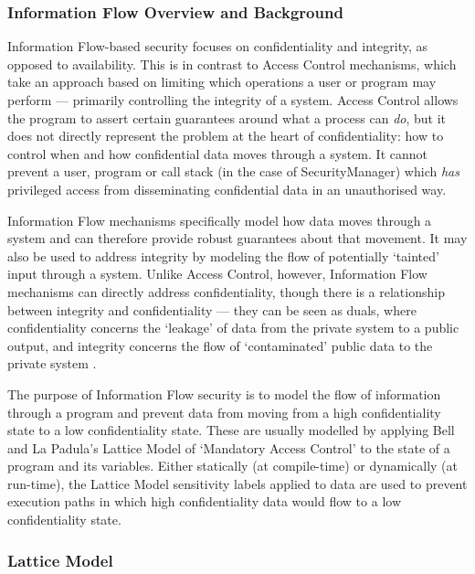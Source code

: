 \subsubsection{Information Flow Overview and Background}

Information Flow-based security focuses on confidentiality and integrity, as opposed to availability. This is in contrast to Access Control mechanisms, which take an approach based on limiting which operations a user or program may perform --- primarily controlling the integrity of a system. Access Control allows the program to assert certain guarantees around what a process can \textit{do}, but it does not directly represent the problem at the heart of confidentiality: how to control when and how confidential data moves through a system. It cannot prevent a user, program or call stack (in the case of SecurityManager) which \textit{has} privileged access from disseminating confidential data in an unauthorised way.

Information Flow mechanisms specifically model how data moves through a system and can therefore provide robust guarantees about that movement. It may also be used to address integrity by modeling the flow of potentially `tainted' input through a system. Unlike Access Control, however, Information Flow mechanisms can directly address confidentiality, though there is a relationship between integrity and confidentiality --- they can be seen as duals, where confidentiality concerns the `leakage' of data from the private system to a public output, and integrity concerns the flow of `contaminated' public data to the private system \cite{biba1977integrity} \cite{clarkson2010confintegrity}.

The purpose of Information Flow security is to model the flow of information through a program and prevent data from moving from a high confidentiality state to a low confidentiality state. These are usually modelled by applying Bell and La Padula's Lattice Model \cite{bell1976lattice} of `Mandatory Access Control' to the state of a program and its variables. Either statically (at compile-time) or dynamically (at run-time), the Lattice Model sensitivity labels applied to data are used to prevent execution paths in which high confidentiality data would flow to a low confidentiality state.

\subsubsection{Lattice Model}

